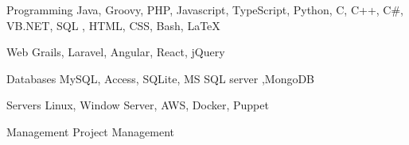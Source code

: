 
\begin{cvskills}

  \cvskill
    {Programming} %
    {Java, Groovy, PHP, Javascript, TypeScript, Python, C, C++, C\#, VB.NET, SQL , HTML, CSS, Bash, \LaTeX} %

  \cvskill
    {Web} %
    {Grails, Laravel, Angular, React, jQuery} %

  \cvskill
    {Databases} %
    {MySQL, Access, SQLite, MS SQL server ,MongoDB} %

  \cvskill
    {Servers} %
    {Linux, Window Server, AWS, Docker, Puppet} %


  \cvskill
    {Management} %
    {Project Management} %


\end{cvskills}
